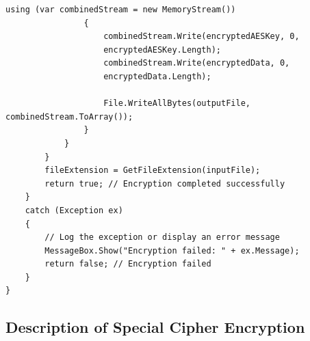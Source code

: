 \documentclass[a4paper,oneside,11pt]{book}
\begin{document}
\begin{lstlisting}[language=Csh, caption={Code for Special Cipher Encryption}]
                using (var combinedStream = new MemoryStream())
                {
                    combinedStream.Write(encryptedAESKey, 0, 
                    encryptedAESKey.Length);
                    combinedStream.Write(encryptedData, 0, 
                    encryptedData.Length);
    
                    File.WriteAllBytes(outputFile, combinedStream.ToArray());
                }
            }
        }
        fileExtension = GetFileExtension(inputFile);
        return true; // Encryption completed successfully
    }
    catch (Exception ex)
    {
        // Log the exception or display an error message
        MessageBox.Show("Encryption failed: " + ex.Message);
        return false; // Encryption failed
    }
}
\end{lstlisting}

\subsection{Description of Special Cipher Encryption}
\end{document}
